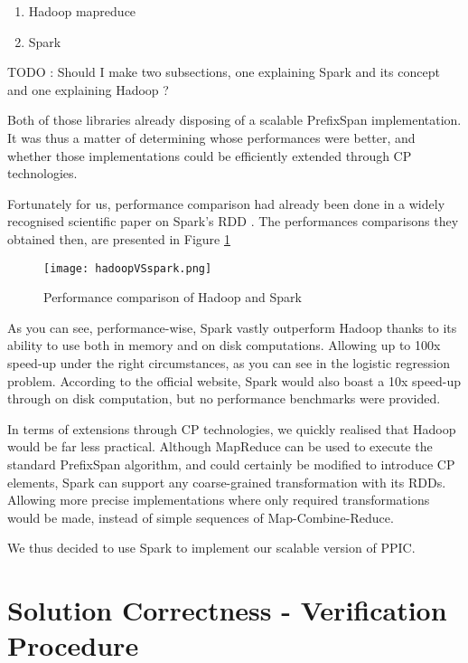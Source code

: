 \documentclass{eplmastersthesis}
\begin{document}
\begin{enumerate}
\item Hadoop mapreduce
\item Spark
\end{enumerate}

TODO : Should I make two subsections, one explaining Spark and its concept and one explaining Hadoop ?

Both of those libraries already disposing of a scalable PrefixSpan implementation. It was thus a matter of determining whose performances were better, and whether those implementations could be efficiently extended through CP technologies. \newline

Fortunately for us, performance comparison had already been done in a widely recognised scientific paper on Spark's RDD \cite{RDD}. The performances comparisons they obtained then, are presented in Figure \ref{fig:hadoopVSspark}

\begin{figure}[h]
  \centering
  \texttt{[image: hadoopVSspark.png]}
  \caption{Performance comparison of Hadoop and Spark}
  \label{fig:hadoopVSspark}
\end{figure}

As you can see, performance-wise, Spark vastly outperform Hadoop thanks to its ability to use both in memory and on disk computations. Allowing up to 100x speed-up under the right circumstances, as you can see in the logistic regression problem. According to the official website, Spark would also boast a 10x speed-up through on disk computation, but no performance benchmarks were provided. \newline

In terms of extensions through CP technologies, we quickly realised that Hadoop would be far less practical. Although MapReduce can be used to execute the standard PrefixSpan algorithm, and could certainly be modified to introduce CP elements, Spark can support any coarse-grained transformation with its RDDs. Allowing more precise implementations where only required transformations would be made, instead of simple sequences of Map-Combine-Reduce. \newline

We thus decided to use Spark to implement our scalable version of PPIC.

\section{Solution Correctness - Verification Procedure}
\end{document}
